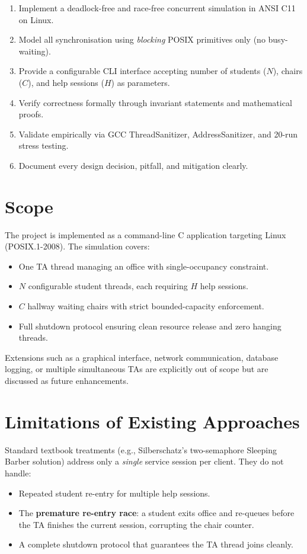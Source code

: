 \documentclass[12pt,a4paper]{report}
\begin{document}
\begin{enumerate}[leftmargin=2em,itemsep=2pt]
  \item Implement a deadlock-free and race-free concurrent simulation in ANSI C11 on Linux.
  \item Model all synchronisation using \emph{blocking} POSIX primitives only (no busy-waiting).
  \item Provide a configurable CLI interface accepting number of students ($N$), chairs ($C$),
        and help sessions ($H$) as parameters.
  \item Verify correctness formally through invariant statements and mathematical proofs.
  \item Validate empirically via GCC ThreadSanitizer, AddressSanitizer, and 20-run stress testing.
  \item Document every design decision, pitfall, and mitigation clearly.
\end{enumerate}

\section{Scope}

The project is implemented as a command-line C application targeting Linux (POSIX.1-2008). The
simulation covers:
\begin{itemize}[leftmargin=2em,itemsep=2pt]
  \item One TA thread managing an office with single-occupancy constraint.
  \item $N$ configurable student threads, each requiring $H$ help sessions.
  \item $C$ hallway waiting chairs with strict bounded-capacity enforcement.
  \item Full shutdown protocol ensuring clean resource release and zero hanging threads.
\end{itemize}
Extensions such as a graphical interface, network communication, database logging, or multiple
simultaneous TAs are explicitly out of scope but are discussed as future enhancements.

\section{Limitations of Existing Approaches}

Standard textbook treatments (e.g., Silberschatz's two-semaphore Sleeping Barber solution)
address only a \emph{single} service session per client. They do not handle:
\begin{itemize}[leftmargin=2em,itemsep=2pt]
  \item Repeated student re-entry for multiple help sessions.
  \item The \textbf{premature re-entry race}: a student exits office and re-queues before the
        TA finishes the current session, corrupting the chair counter.
  \item A complete shutdown protocol that guarantees the TA thread joins cleanly.
\end{itemize}
\end{document}
